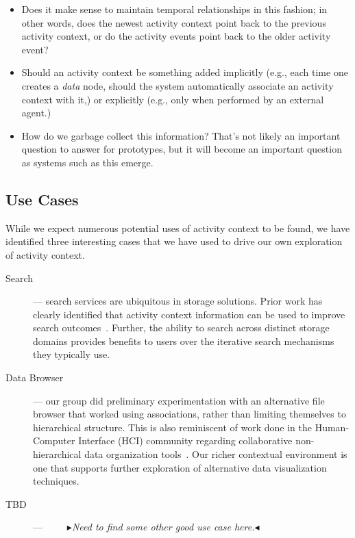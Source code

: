 \documentclass[sigconf,anonymous,review]{acmart}
\newcommand{\nbc}[3]{
 {\colorbox{#3}{\bfseries\sffamily\scriptsize\textcolor{white}{#1}}}
 {\textcolor{#3}{\sf\small$\blacktriangleright$\textit{#2}$\blacktriangleleft$}}}
\newcommand\tm[1]{\nbc{TM}{#1}{tmcolor}}
\begin{document}
\begin{itemize}
    \item Does it make sense to maintain temporal relationships in this fashion;
    in other words, does the newest activity context point back to the previous
    activity context, or do the activity events point back to the older activity
    event?

    \item Should an activity context be something added implicitly (e.g., each
    time one creates a \emph{data} node, should the system automatically
    associate an activity context with it,) or explicitly (e.g., only when
    performed by an external agent.)

    \item How do we garbage collect this information?  That's not likely an
    important question to answer for prototypes, but it will become an important
    question as systems such as this emerge.

\end{itemize}

\subsection{Use Cases}

While we expect numerous potential uses of activity context to be found, we have
identified three interesting cases that we have used to drive our own
exploration of activity context.

\begin{description}
    \item[Search] --- search services are ubiquitous in storage
    solutions.  Prior work has clearly identified that activity context
    information can be used to improve search
    outcomes~\cite{vianna2019searching}.  Further, the ability to search across
    distinct storage domains provides benefits to users over the iterative
    search mechanisms they typically use.
    \item[Data Browser] --- our group did preliminary experimentation with an
    alternative file browser that worked using associations, rather than
    limiting themselves to hierarchical structure.  This is also reminiscent of
    work done in the Human-Computer Interface (HCI) community regarding
    collaborative non-hierarchical data organization
    tools~\cite{collins2007tabletop}.  Our richer contextual environment is one
    that supports further exploration of alternative data visualization techniques.
    \item[TBD] --- \tm{Need to find some other good use case here.}
\end{description}
\end{document}
